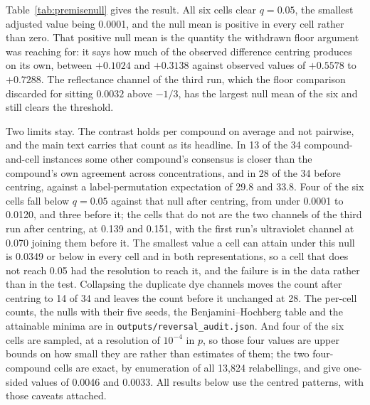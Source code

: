 \documentclass[journal=jacsat,manuscript=suppinfo,margin=1in]{achemso}
\begin{document}
Table~\ref{tab:premisenull} gives the result. All six cells clear
$q = 0.05$, the smallest adjusted value being 0.0001, and the null mean is
positive in every cell rather than zero. That positive null mean is the
quantity the withdrawn floor argument was reaching for: it says how much of
the observed difference centring produces on its own, between $+0.1024$ and
$+0.3138$ against observed values of $+0.5578$ to $+0.7288$. The reflectance
channel of the third run, which the floor comparison discarded for sitting
$0.0032$ above $-1/3$, has the largest null mean of the six and still clears
the threshold.

Two limits stay. The contrast holds per compound on average and not pairwise,
and the main text carries that count as its headline. In 13 of the 34
compound-and-cell instances some other compound's consensus is closer than the
compound's own agreement across concentrations, and in 28 of the 34 before
centring, against a label-permutation expectation of 29.8 and 33.8. Four of the
six cells fall below $q = 0.05$ against that null after centring, from under
0.0001 to 0.0120, and three before it; the cells that do not are the two
channels of the third run after centring, at 0.139 and 0.151, with the first
run's ultraviolet channel at 0.070 joining them before it. The smallest value a
cell can attain under this null is 0.0349 or below in every cell and in both
representations, so a cell that does not reach 0.05 had the resolution to reach
it, and the failure is in the data rather than in the test. Collapsing the
duplicate dye channels moves the count after centring to 14 of 34 and leaves
the count before it unchanged at 28. The per-cell counts, the nulls with their
five seeds, the Benjamini--Hochberg table and the attainable minima are in
\texttt{outputs/reversal\_audit.json}. %
And four of the six cells are
sampled, at a resolution of $10^{-4}$ in $p$, so those four values are upper
bounds on how small they are rather than estimates of them; the two
four-compound cells are exact, by enumeration of all 13,824 relabellings, and
give one-sided values of 0.0046 and 0.0033. All results below use the centred patterns, with those caveats attached.

\end{document}
